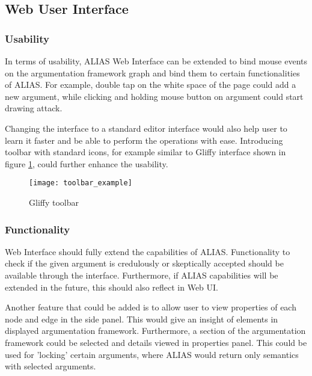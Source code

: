 \subsection{Web User Interface}

\subsubsection{Usability}
In terms of usability, ALIAS Web Interface can be extended to bind mouse events on the argumentation framework graph and bind them to certain functionalities of ALIAS. For example, double tap on the white space of the page could add a new argument, while clicking and holding mouse button on argument could start drawing attack. 

Changing the interface to a standard editor interface would also help user to learn it faster and be able to perform the operations with ease. Introducing toolbar with standard icons, for example similar to Gliffy interface shown in figure \ref{fig:toolbarExample}, could further enhance the usability.

\begin{figure}
	\texttt{[image: toolbar\_example]}
	\caption{Gliffy toolbar}
	\label{fig:toolbarExample}
\end{figure}

\subsubsection{Functionality}
Web Interface should fully extend the capabilities of ALIAS. Functionality to check if the given argument is credulously or skeptically accepted should be available through the interface. Furthermore, if ALIAS capabilities will be extended in the future, this should also reflect in Web UI.

Another feature that could be added is to allow user to view properties of each node and edge in the side panel. This would give an insight of elements in displayed argumentation framework. Furthermore, a section of the argumentation framework could be selected and details viewed in properties panel. This could be used for 'locking' certain arguments, where ALIAS would return only semantics with selected arguments.

